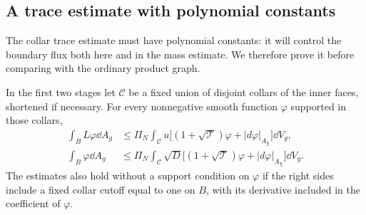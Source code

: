 \subsection{A trace estimate with polynomial constants}

The collar trace estimate must have polynomial constants: it will
control the boundary flux both here and in the mass estimate.
We therefore prove it before comparing with the ordinary product graph.

\begin{lemma}
\label{n3:apriori:trace}
In the first two stages let $\mathcal C$ be a fixed union of disjoint
collars of the inner faces, shortened if necessary.  For every
nonnegative smooth function $\varphi$ supported in those collars,
\begin{align}
 \int_B L\varphi\dd A_g
 &\le\Pi_N\int_{\mathcal C}u
       \bigl[(1+\sqrt{\mathcal T})\varphi
                          +|d\varphi|_{A_\chi}\bigr]\dd V_g,
 \label{n3:apriori:weighted-trace}\\
 \int_B\varphi\dd A_g
 &\le\Pi_N\int_{\mathcal C}\sqrt D
       \bigl[(1+\sqrt{\mathcal T})\varphi
                          +|d\varphi|_{A_\chi}\bigr]\dd V_g.
 \label{n3:apriori:unweighted-trace}
\end{align}
The estimates also hold without a support condition on $\varphi$
if the right sides include a fixed collar cutoff equal to one on
$B$, with its derivative included in the coefficient of $\varphi$.
\end{lemma}

